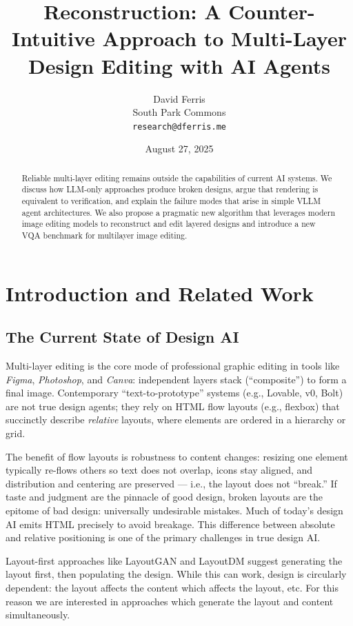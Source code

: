 \documentclass{article}
\title{Reconstruction: A Counter-Intuitive Approach to Multi-Layer Design Editing with AI Agents}
\author{
  David Ferris \\
  South Park Commons \\
  \texttt{research@dferris.me}
}
\date{August 27, 2025}
\begin{document}
\maketitle

\begin{abstract}
Reliable multi-layer editing remains outside the capabilities of current AI systems. We discuss how LLM-only approaches produce broken designs, argue that rendering is equivalent to verification, and explain the failure modes that arise in simple VLLM agent architectures. We also propose a pragmatic new algorithm that leverages modern image editing models to reconstruct and edit layered designs and introduce a new VQA benchmark for multilayer image editing.
\end{abstract}

\section{Introduction and Related Work}
\subsection{The Current State of Design AI}
Multi-layer editing is the core mode of professional graphic editing in tools like \emph{Figma}, \emph{Photoshop}, and \emph{Canva}: independent layers stack (``composite'') to form a final image. Contemporary ``text-to-prototype'' systems (e.g., Lovable, v0, Bolt) are not true design agents; they rely on HTML flow layouts (e.g., flexbox) that succinctly describe \emph{relative} layouts, where elements are ordered in a hierarchy or grid.

The benefit of flow layouts is robustness to content changes: resizing one element typically re-flows others so text does not overlap, icons stay aligned, and distribution and centering are preserved --- i.e., the layout does not ``break.'' If taste and judgment are the pinnacle of good design, broken layouts are the epitome of bad design: universally undesirable mistakes. Much of today's design AI emits HTML precisely to avoid breakage. This difference between absolute and relative positioning is one of the primary challenges in true design AI.

Layout-first approaches like LayoutGAN\cite{li2019layoutgan} and LayoutDM\cite{inoue2023layoutdm} suggest generating the layout first, then populating the design. While this can work, design is circularly dependent: the layout affects the content which affects the layout, etc. For this reason we are interested in approaches which generate the layout and content simultaneously.
\end{document}
